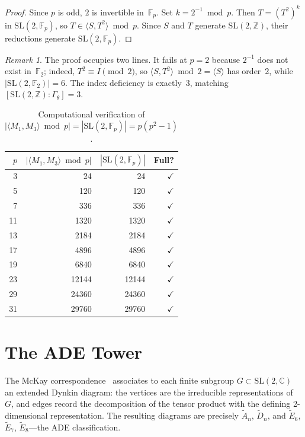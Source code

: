 \documentclass[12pt]{amsart}
\theoremstyle{definition}
\theoremstyle{remark}
\newtheorem{remark}[theorem]{Remark}
\newcommand{\SL}{\mathrm{SL}}
\newcommand{\Fp}{\mathbb{F}_p}
\newcommand{\Z}{\mathbb{Z}}
\newcommand{\C}{\mathbb{C}}
\newcommand{\Gtheta}{\Gamma_\theta}
\begin{document}
\begin{proof}
Since $p$ is odd, $2$ is invertible in~$\Fp$.  Set $k = 2^{-1} \bmod p$.
Then $T = (T^2)^k$ in $\SL(2,\Fp)$, so $T \in \langle S, T^2\rangle
\bmod p$.  Since $S$ and $T$ generate $\SL(2,\Z)$, their reductions
generate $\SL(2,\Fp)$.
\end{proof}

\begin{remark}
The proof occupies two lines.  It fails at $p=2$ because $2^{-1}$ does
not exist in~$\mathbb{F}_2$; indeed, $T^2 \equiv I \pmod{2}$, so
$\langle S, T^2\rangle \bmod 2 = \langle S\rangle$ has order~2,
while $|\SL(2,\mathbb{F}_2)| = 6$.  The index deficiency is exactly~3,
matching $[\SL(2,\Z):\Gtheta]=3$.
\end{remark}

\begin{table}[ht]
\centering
\caption{Computational verification of
$|\langle M_1, M_3\rangle \bmod p| = |\SL(2,\Fp)| = p(p^2-1)$.}
\label{tab:sl2fp}
\begin{tabular}{rrrr}
\toprule
$p$ & $|\langle M_1,M_3\rangle \bmod p|$ & $|\SL(2,\Fp)|$ & Full? \\
\midrule
3  & 24     & 24     & $\checkmark$ \\
5  & 120    & 120    & $\checkmark$ \\
7  & 336    & 336    & $\checkmark$ \\
11 & 1320   & 1320   & $\checkmark$ \\
13 & 2184   & 2184   & $\checkmark$ \\
17 & 4896   & 4896   & $\checkmark$ \\
19 & 6840   & 6840   & $\checkmark$ \\
23 & 12144  & 12144  & $\checkmark$ \\
29 & 24360  & 24360  & $\checkmark$ \\
31 & 29760  & 29760  & $\checkmark$ \\
\bottomrule
\end{tabular}
\end{table}


\section{The ADE Tower}\label{sec:ade}

The McKay correspondence~\cite{mckay} associates to each finite subgroup
$G \subset \SL(2,\C)$ an extended Dynkin diagram: the vertices are the
irreducible representations of~$G$, and edges record the decomposition
of the tensor product with the defining 2-dimensional representation.
The resulting diagrams are precisely $\widetilde{A}_n$,
$\widetilde{D}_n$, and $\widetilde{E}_6$, $\widetilde{E}_7$,
$\widetilde{E}_8$---the ADE classification.
\end{document}
